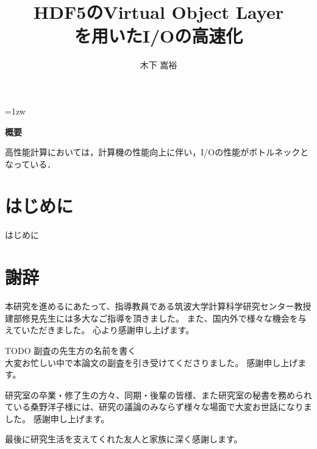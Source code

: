 \documentclass[a4paper,11pt]{jreport}
\title{HDF5のVirtual Object Layer\\を用いたI/Oの高速化}
\author{木下 嵩裕}
\begin{document}
\maketitle
\thispagestyle{empty}
\newpage

\thispagestyle{empty}
\vspace*{20pt plus 1fil}
\parindent=1zw
\noindent
\begin{center}
{\bf 概要}
\vspace{5mm}
\end{center}

高性能計算においては，計算機の性能向上に伴い，I/Oの性能がボトルネックとなっている．

\par
\vspace{0pt plus 1fil}
\newpage

\tableofcontents
\listoffigures

\pagebreak \setcounter{page}{1}




\chapter{はじめに}

はじめに




\chapter*{謝辞}

本研究を進めるにあたって、指導教員である筑波大学計算科学研究センター教授 建部修見先生には多大なご指導を頂きました。
また、国内外で様々な機会を与えていただきました。
心より感謝申し上げます。

TODO 副査の先生方の名前を書く \\
大変お忙しい中で本論文の副査を引き受けてくださりました。
感謝申し上げます。

研究室の卒業・修了生の方々、同期・後輩の皆様、また研究室の秘書を務められている桑野洋子様には、研究の議論のみならず様々な場面で大変お世話になりました。
感謝申し上げます。

最後に研究生活を支えてくれた友人と家族に深く感謝します。

\newpage

\renewcommand{\bibname}{参考文献}



\end{document}
